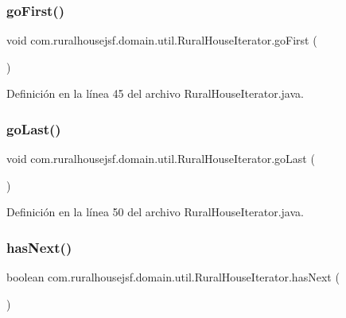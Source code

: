 \subsubsection{\texorpdfstring{goFirst()}{goFirst()}}
{\footnotesize\ttfamily void com.\+ruralhousejsf.\+domain.\+util.\+Rural\+House\+Iterator.\+go\+First (\begin{DoxyParamCaption}{ }\end{DoxyParamCaption})}



Definición en la línea 45 del archivo Rural\+House\+Iterator.\+java.

\mbox{\label{classcom_1_1ruralhousejsf_1_1domain_1_1util_1_1_rural_house_iterator_a58fe2a76236f3578ff3eb7f22b14bc5c}} 
\subsubsection{\texorpdfstring{goLast()}{goLast()}}
{\footnotesize\ttfamily void com.\+ruralhousejsf.\+domain.\+util.\+Rural\+House\+Iterator.\+go\+Last (\begin{DoxyParamCaption}{ }\end{DoxyParamCaption})}



Definición en la línea 50 del archivo Rural\+House\+Iterator.\+java.

\mbox{\label{classcom_1_1ruralhousejsf_1_1domain_1_1util_1_1_rural_house_iterator_a9c16d216cbe652522d6c903294938eda}} 
\subsubsection{\texorpdfstring{hasNext()}{hasNext()}}
{\footnotesize\ttfamily boolean com.\+ruralhousejsf.\+domain.\+util.\+Rural\+House\+Iterator.\+has\+Next (\begin{DoxyParamCaption}{ }\end{DoxyParamCaption})}



